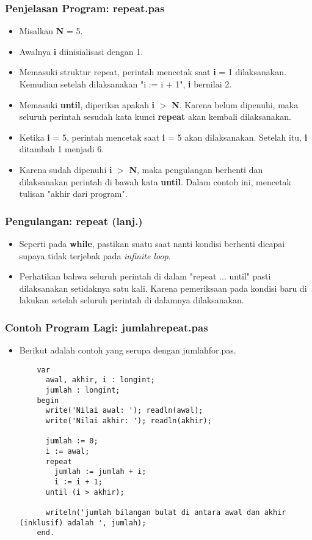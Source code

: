 \begin{frame}
\frametitle{Penjelasan Program: repeat.pas}
\begin{itemize}
  \item Misalkan \textbf{N} = 5.
  \item Awalnya \textbf{i} diinisialisasi dengan 1.
  \item Memasuki struktur repeat, perintah mencetak saat \textbf{i} = 1 dilaksanakan. Kemudian setelah dilaksanakan "i := i + 1", \textbf{i} bernilai 2.
  \item Memasuki \textbf{until}, diperiksa apakah \textbf{i} $>$ \textbf{N}. Karena belum dipenuhi, maka seluruh perintah sesudah kata kunci \textbf{repeat} akan kembali dilaksanakan.
  \item Ketika \textbf{i} = 5, perintah mencetak saat \textbf{i} = 5 akan dilaksanakan. Setelah itu, \textbf{i} ditambah 1 menjadi 6.
  \item Karena sudah dipenuhi \textbf{i} $>$ \textbf{N}, maka pengulangan berhenti dan dilaksanakan perintah di bawah kata \textbf{until}. Dalam contoh ini, mencetak tulisan "akhir dari program".
\end{itemize}
\end{frame}

\begin{frame}
\frametitle{Pengulangan: repeat (lanj.)}
\begin{itemize}
  \item Seperti pada \textbf{while}, pastikan suatu saat nanti kondisi berhenti dicapai supaya tidak terjebak pada \textit{infinite loop}.
  \item Perhatikan bahwa seluruh perintah di dalam "repeat ... until" \alert{pasti} dilaksanakan setidaknya satu kali. Karena pemeriksaan pada kondisi baru di lakukan setelah seluruh perintah di dalamnya dilaksanakan.
\end{itemize}
\end{frame}

\begin{frame}[fragile]
\frametitle{Contoh Program Lagi: jumlahrepeat.pas}
\begin{itemize}
  \item Berikut adalah contoh yang serupa dengan jumlahfor.pas.
  \begin{lstlisting}
    var
      awal, akhir, i : longint;
      jumlah : longint;
    begin
      write('Nilai awal: '); readln(awal);
      write('Nilai akhir: '); readln(akhir);

      jumlah := 0;
      i := awal;
      repeat
        jumlah := jumlah + i;
        i := i + 1;
      until (i > akhir);

      writeln('jumlah bilangan bulat di antara awal dan akhir (inklusif) adalah ', jumlah);
    end.
  \end{lstlisting}
\end{itemize}
\end{frame}

